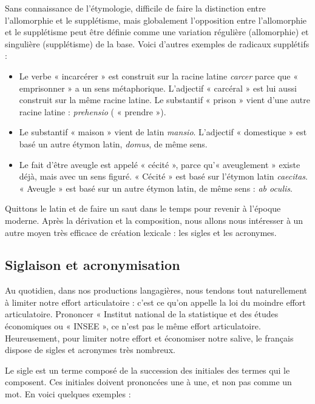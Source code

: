 Sans connaissance de l’étymologie, difficile de faire la distinction entre l’allomorphie et le supplétisme, mais globalement l’opposition entre l’allomorphie et le supplétisme peut être définie comme une variation régulière (allomorphie) et singulière (supplétisme) de la base. Voici d’autres exemples de radicaux supplétifs :
\begin{itemize}
\item Le verbe « incarcérer » est construit sur la racine latine \textit{carcer} parce que « emprisonner » a un sens métaphorique. L’adjectif « carcéral » est lui aussi construit sur la même racine latine. Le substantif « prison » vient d’une autre racine latine : \textit{prehensio} ( « prendre »).
\item Le substantif « maison » vient de latin \textit{mansio}. L’adjectif « domestique » est basé un autre étymon latin, \textit{domus}, de même sens.
\item Le fait d’être aveugle est appelé « cécité », parce qu’« aveuglement » existe déjà, mais avec un sens figuré. « Cécité » est basé sur l’étymon latin \textit{caecitas}. « Aveugle » est basé sur un autre étymon latin, de même sens : \textit{ab oculis}.
\end{itemize}
Quittons le latin et de faire un saut dans le temps pour revenir à l’époque moderne. Après la dérivation et la composition, nous allons nous intéresser à un autre moyen très efficace de création lexicale : les sigles et les acronymes.

\subsection{Siglaison et acronymisation}
Au quotidien, dans nos productions langagières, nous tendons tout naturellement à limiter notre effort articulatoire : c’est ce qu’on appelle la loi du moindre effort articulatoire. Prononcer « Institut national de la statistique et des études économiques ou « INSEE », ce n’est pas le même effort articulatoire. Heureusement, pour limiter notre effort et économiser notre salive, le français dispose de sigles et acronymes très nombreux.

Le sigle est un terme composé de la succession des initiales des termes qui le composent. Ces initiales doivent prononcées une à une, et non pas comme un mot. En voici quelques exemples :

